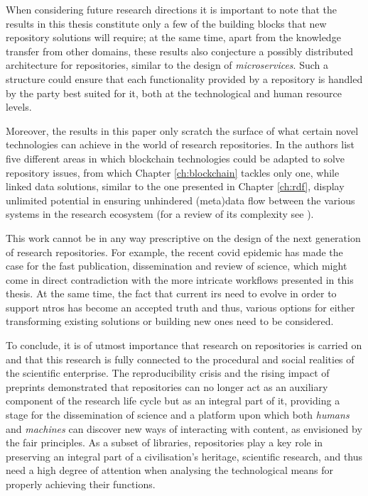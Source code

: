 When considering future research directions it is important to note that the results in this thesis constitute only a few of the building blocks that new repository solutions will require; at the same time, apart from the knowledge transfer from other domains, these results also conjecture a possibly distributed architecture for repositories, similar to the design of \emph{microservices}. Such a structure could ensure that each functionality provided by a repository is handled by the party best suited for it, both at the technological and human resource levels.

Moreover, the results in this paper only scratch the surface of what certain novel technologies can achieve in the world of research repositories. In \cite{dsbc} the authors list five different areas in which blockchain technologies could be adapted to solve repository issues, from which Chapter \ref{ch:blockchain} tackles only one, while linked data solutions, similar to the one presented in Chapter \ref{ch:rdf}, display unlimited potential in ensuring unhindered (meta)data flow between the various systems in the research ecosystem (for a review of its complexity see \cite{101}).

This work cannot be in any way prescriptive on the design of the next generation of research repositories. For example, the recent \gls{covid} epidemic has made the case for the fast publication, dissemination and review of science\cite{cochran}, which might come in direct contradiction with the more intricate workflows presented in this thesis. At the same time, the fact that current \glspl{ir} need to evolve in order to support \glspl{ntro} has become an accepted truth and thus, various options for either transforming existing solutions or building new ones need to be considered.

To conclude, it is of utmost importance that research on repositories is carried on and that this research is fully connected to the procedural and social realities of the scientific enterprise. The reproducibility crisis and the rising impact of preprints demonstrated that repositories can no longer act as an auxiliary component of the research life cycle but as an integral part of it, providing a stage for the dissemination of science and a platform upon which both \emph{humans} and \emph{machines} can discover new ways of interacting with content, as envisioned by the \gls{fair} principles. As a subset of libraries, repositories play a key role in preserving an integral part of a civilisation's heritage, scientific research, and thus need a high degree of attention when analysing the technological means for properly achieving their functions.